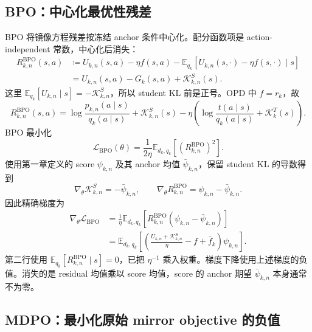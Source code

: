 \subsection{BPO：中心化最优性残差}
\label{subsec:ch2-bpo-loss-derivation}

BPO 将镜像方程残差按冻结 anchor 条件中心化。配分函数项是 action-independent 常数，中心化后消失：
\begin{align}
R_{k,n}^{\mathrm{BPO}}(s,a)
&\coloneqq U_{k,n}(s,a)-\eta f(s,a)
-\mathbb E_{ q_k}[U_{k,n}(s,\cdot)-\eta f(s,\cdot)\mid s]
\label{eq:ch2-bpo-from-optimality}\\
&=U_{k,n}(s,a)-G_k(s,a)+\mathcal K_{k,n}^{S}(s).
\label{eq:ch2-bpo-expanded}
\end{align}
这里 $\mathbb E_{ q_k}[U_{k,n}\mid s]=-\mathcal K_{k,n}^{S}$，所以 student KL 前是正号。OPD 中 $f=r_k$，故
\begin{equation}
R_{k,n}^{\mathrm{BPO}}(s,a)
=\log\frac{ p_{k,n}(a\mid s)}{ q_k(a\mid s)}+\mathcal K_{k,n}^{S}(s)
-\eta\left(\log\frac{ t(a\mid s)}{ q_k(a\mid s)}+\mathcal K_k^{T}(s)\right).
\label{eq:ch2-bpo-opd-expanded}
\end{equation}
BPO 最小化
\begin{equation}
\mathcal L_{\mathrm{BPO}}(\theta)
=\frac1{2\eta}\mathbb E_{d_k, q_k}[(R_{k,n}^{\mathrm{BPO}})^2].
\label{eq:ch2-bpo-loss-bridge}
\end{equation}
使用第一章定义的 score $\psi_{k,n}$ 及其 anchor 均值 $\bar\psi_{k,n}$，保留 student KL 的导数得到
\begin{equation*}
\nabla_\theta\mathcal K_{k,n}^{S}=-\bar\psi_{k,n},\qquad
\nabla_\theta R_{k,n}^{\mathrm{BPO}}=\psi_{k,n}-\bar\psi_{k,n}.
\end{equation*}
因此精确梯度为
\begin{align}
\nabla_\theta\mathcal L_{\mathrm{BPO}}
&=\frac1\eta\mathbb E_{d_k, q_k}[R_{k,n}^{\mathrm{BPO}}(\psi_{k,n}-\bar\psi_{k,n})]
\label{eq:ch2-bpo-gradient-bridge}\\
&=\mathbb E_{d_k, q_k}\left[
\left(\frac{U_{k,n}+\mathcal K_{k,n}^{S}}\eta-f+\bar f_k\right)\psi_{k,n}\right].
\end{align}
第二行使用 $\mathbb E_{ q_k}[R_{k,n}^{\mathrm{BPO}}\mid s]=0$，已把 $\eta^{-1}$ 乘入权重。梯度下降使用上述梯度的负值。消失的是 residual 均值乘以 score 均值，score 的 anchor 期望 $\bar\psi_{k,n}$ 本身通常不为零。

\subsection{MDPO：最小化原始 mirror objective 的负值}
\label{subsec:ch2-mdpo-loss-derivation}

